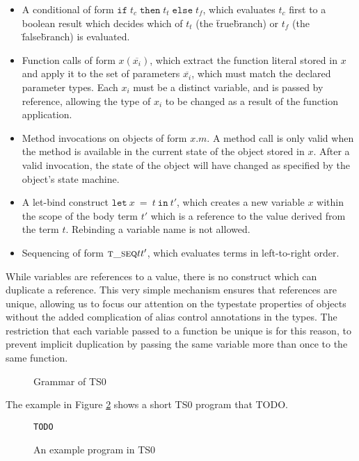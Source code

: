 \documentclass[preprint]{sigplanconf}
\newcommand{\figref}[1]{Figure \ref{#1}}
\newcommand{\tseq}{\textsc{t\_seq} }
\newcommand{\lett}[3]{\mathtt{let}\:#1\:\mathtt{=}\:#2\:\mathtt{in}\:#3}
\newcommand{\ift}[3]{\mathtt{if} \; #1 \; \mathtt{then} \; #2 \; \mathtt{else} \; #3}
\begin{document}
\begin{itemize}
\item A conditional of form $\ift{t_c}{t_t}{t_f}$, which evaluates
$t_c$ first to a boolean result which decides which of $t_t$ 
(the \"true\" branch) or $t_f$ (the \"false\" branch) is
evaluated.
\item Function calls of form $x(\overline{x_i})$, which extract the function
literal stored in $x$ and apply it to the set of parameters $\overline{x_i}$,
which must match the declared parameter types. Each $x_i$ must be a distinct
variable, and is passed by reference, allowing the type of $x_i$ to be changed
as a result of the function application.
\item Method invocations on objects of form $x.m$. A method call is only
valid when the method is available in the current state of the object stored
in $x$. After a valid invocation, the state of the object will have changed
as specified by the object's state machine.
\item A let-bind construct $\lett{x}{t}{t'}$, which creates a new variable
$x$ within the scope of the body term $t'$ which is a reference to the value
derived from the term $t$. Rebinding a variable name is not allowed.
\item Sequencing of form $\tseq{t}{t'}$, which evaluates terms in 
left-to-right order.
\end{itemize}

While variables are references to a value, there is no construct which
can duplicate a reference. This very simple mechanism
ensures that references are unique, allowing us to focus our attention on the
typestate properties of objects without the added complication of alias
control annotations in the types. The restriction that each variable passed to
a function be unique is for this reason, to prevent implicit duplication
by passing the same variable more than once to the same function.

\begin{figure}

\ottgrammartabular{
\ottt\ottinterrule
\ottv\ottinterrule
\otto\ottinterrule
\ottT\ottinterrule
\ottO\ottinterrule
}

\caption{\label{fig:grammar} Grammar of TS0}
\end{figure}

The example in \figref{fig:exampleprog} shows a short TS0 program
that TODO.

\begin{figure}
\begin{lstlisting}
TODO
\end{lstlisting}
\caption{\label{fig:exampleprog} An example program in TS0}
\end{figure}
\end{document}
